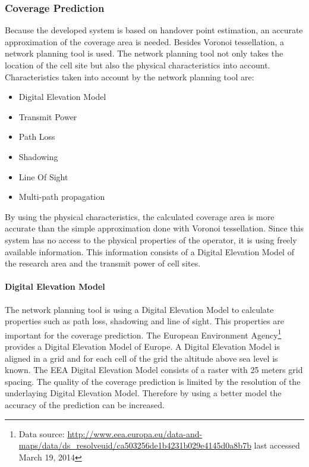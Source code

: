 \subsubsection{Coverage Prediction}
Because the developed system is based on handover point estimation, an accurate approximation of the coverage area is needed. Besides Voronoi tessellation, a network planning tool is used. The network planning tool not only takes the location of the cell site but also the physical characteristics into account. Characteristics taken into account by the network planning tool are:
\begin{itemize}
	\item Digital Elevation Model
	\item Transmit Power
	\item Path Loss
	\item Shadowing
	\item Line Of Sight
	\item Multi-path propagation
\end{itemize}
By using the physical characteristics, the calculated coverage area is more accurate than the simple approximation done with Voronoi tessellation. Since this system has no access to the physical properties of the operator, it is using freely available information. This information consists of a Digital Elevation Model of the research area and the transmit power of cell sites.
\paragraph{Digital Elevation Model}
The network planning tool is using a Digital Elevation Model to calculate properties such as path loss, shadowing and line of sight. This properties are important for the coverage prediction. The European Environment Agency\footnote{Data source: \url{http://www.eea.europa.eu/data-and-maps/data/ds_resolveuid/ca503256de1b4231b029e4145d0a8b7b} last accessed March 19, 2014} provides a Digital Elevation Model of Europe. A Digital Elevation Model is aligned in a grid and for each cell of the grid the altitude above sea level is known. The EEA Digital Elevation Model consists of a raster with 25 meters grid spacing. The quality of the coverage prediction is limited by the resolution of the underlaying Digital Elevation Model. Therefore by using a better model the accuracy of the prediction can be increased.
